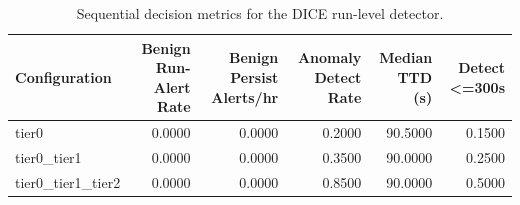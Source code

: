 \begin{table}[t]
\centering
\caption{Sequential decision metrics for the DICE run-level detector.}
\label{tab:dice_sequential_metrics}
\footnotesize
\begin{tabular}{lrrrrr}
\toprule
Configuration & Benign Run-Alert Rate & Benign Persist Alerts/hr & Anomaly Detect Rate & Median TTD (s) & Detect <=300s \\
\midrule
tier0 & 0.0000 & 0.0000 & 0.2000 & 90.5000 & 0.1500 \\
tier0_tier1 & 0.0000 & 0.0000 & 0.3500 & 90.0000 & 0.2500 \\
tier0_tier1_tier2 & 0.0000 & 0.0000 & 0.8500 & 90.0000 & 0.5000 \\
\bottomrule
\end{tabular}

\end{table}
